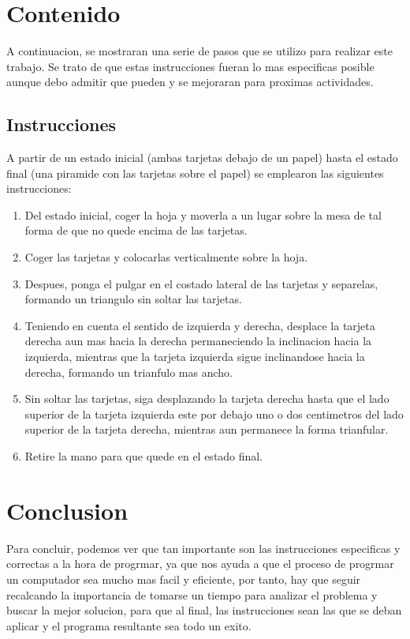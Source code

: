 \documentclass{article}
\begin{document}
\section{Contenido} \label{contenido}
A continuacion, se mostraran una serie de pasos que se utilizo para realizar este trabajo. Se trato de que estas instrucciones fueran lo mas especificas posible aunque debo admitir que pueden y se mejoraran para proximas actividades.

\subsection{Instrucciones}
A partir de un estado inicial (ambas tarjetas debajo de un papel) hasta el estado final (una piramide con las tarjetas sobre el papel) se emplearon las siguientes instrucciones:

\begin{enumerate}
    \item Del estado inicial, coger la hoja y moverla a un lugar sobre la mesa de tal forma de que no quede encima de las tarjetas.
    \item Coger las tarjetas y colocarlas verticalmente sobre la hoja.
    \item Despues, ponga el pulgar en el costado lateral de las tarjetas y separelas, formando un triangulo sin soltar las tarjetas.
    \item Teniendo en cuenta el sentido de izquierda y derecha, desplace la tarjeta derecha aun mas hacia la derecha permaneciendo la inclinacion hacia la izquierda, mientras que la tarjeta izquierda sigue inclinandose hacia la derecha, formando un trianfulo mas ancho.
    \item Sin soltar las tarjetas, siga desplazando la tarjeta derecha hasta que el lado superior de la tarjeta izquierda este por debajo uno o dos centimetros del lado superior de la tarjeta derecha, mientras aun permanece la forma trianfular.
    \item Retire la mano para que quede en el estado final.
\end{enumerate}
\newpage
\section{Conclusion} \label{conclusion}
Para concluir, podemos ver que tan importante son las instrucciones especificas y correctas a la hora de progrmar, ya que nos ayuda a que el proceso  de progrmar un computador sea mucho mas facil y eficiente, por tanto, hay que seguir recalcando la importancia de tomarse un tiempo para analizar el problema y buscar la mejor solucion, para que al final, las instrucciones sean las que se deban aplicar y el programa resultante sea todo un exito.
\end{document}
